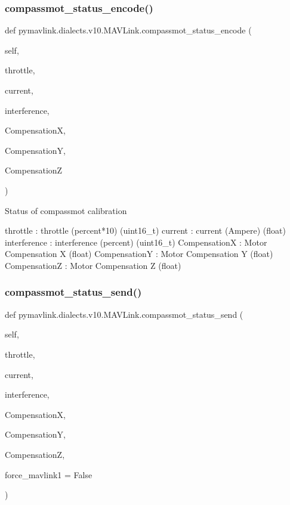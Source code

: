 \begin{DoxyVerb}
\begin{DoxyVerb}
\subsubsection{\texorpdfstring{compassmot\+\_\+status\+\_\+encode()}{compassmot\_status\_encode()}}
{\footnotesize\ttfamily def pymavlink.\+dialects.\+v10.\+M\+A\+V\+Link.\+compassmot\+\_\+status\+\_\+encode (\begin{DoxyParamCaption}\item[{}]{self,  }\item[{}]{throttle,  }\item[{}]{current,  }\item[{}]{interference,  }\item[{}]{CompensationX,  }\item[{}]{CompensationY,  }\item[{}]{CompensationZ }\end{DoxyParamCaption})}

\begin{DoxyVerb}Status of compassmot calibration

throttle                  : throttle (percent*10) (uint16_t)
current                   : current (Ampere) (float)
interference              : interference (percent) (uint16_t)
CompensationX             : Motor Compensation X (float)
CompensationY             : Motor Compensation Y (float)
CompensationZ             : Motor Compensation Z (float)\end{DoxyVerb}
 \mbox{\label{classpymavlink_1_1dialects_1_1v10_1_1MAVLink_a7b6e059ace9b1c72fdd1438b735e98a9}} 
\subsubsection{\texorpdfstring{compassmot\+\_\+status\+\_\+send()}{compassmot\_status\_send()}}
{\footnotesize\ttfamily def pymavlink.\+dialects.\+v10.\+M\+A\+V\+Link.\+compassmot\+\_\+status\+\_\+send (\begin{DoxyParamCaption}\item[{}]{self,  }\item[{}]{throttle,  }\item[{}]{current,  }\item[{}]{interference,  }\item[{}]{CompensationX,  }\item[{}]{CompensationY,  }\item[{}]{CompensationZ,  }\item[{}]{force\+\_\+mavlink1 = {\ttfamily False} }\end{DoxyParamCaption})}


\end{DoxyVerb}
\end{DoxyVerb}

